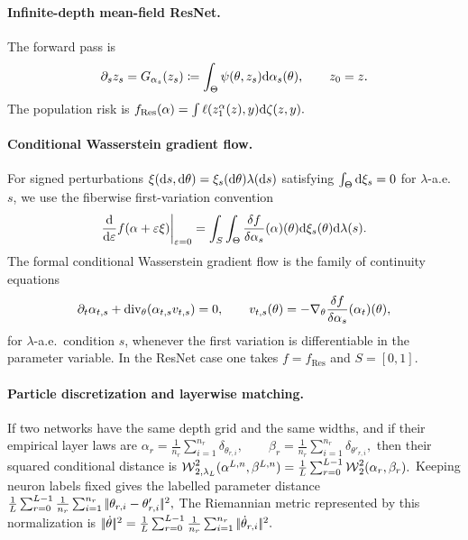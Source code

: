 \paragraph{Infinite-depth mean-field ResNet.}
The forward pass is
\begin{equation}\label{eq-mean-field-resnet-forward}
\partial_s z_s
=
G_{\alpha_s}(z_s)
\coloneqq
\int_\Theta \psi(\theta,z_s)\mathrm{d}\alpha_s(\theta),
\qquad z_0=z.
\end{equation}
The population risk is \(f_{\mathrm{Res}}(\alpha) = \int \ell(z_1^\alpha(z),y)\mathrm{d}\zeta(z,y).\)
\paragraph{Conditional Wasserstein gradient flow.}
For signed perturbations $\xi(\mathrm{d} s,\mathrm{d}\theta)=\xi_s(\mathrm{d}\theta)\lambda(\mathrm{d} s)$ satisfying $\int_\Theta\mathrm{d}\xi_s=0$ for $\lambda$-a.e.\ $s$, we use the fiberwise first-variation convention
\[
\frac{\mathrm{d}}{\mathrm{d}\varepsilon}f(\alpha+\varepsilon\xi)\bigg|_{\varepsilon=0}
=
\int_S\int_\Theta \frac{\delta f}{\delta\alpha_s}(\alpha)(\theta)\mathrm{d}\xi_s(\theta)\mathrm{d}\lambda(s).
\]
The formal conditional Wasserstein gradient flow is the family of continuity equations
\begin{equation}\label{eq-conditional-resnet-gradient-flow}
\partial_t\alpha_{t,s}
+\operatorname{div}_\theta(\alpha_{t,s}v_{t,s})=0,
\qquad
v_{t,s}(\theta)
=
-\nabla_\theta\frac{\delta f}{\delta\alpha_s}(\alpha_t)(\theta),
\end{equation}
for $\lambda$-a.e.\ condition $s$, whenever the first variation is differentiable in the parameter variable. In the ResNet case one takes $f=f_{\mathrm{Res}}$ and $S=[0,1]$.

\paragraph{Particle discretization and layerwise matching.}
If two networks have the same depth grid and the same widths, and if their empirical layer laws are \(\alpha_r=\frac1{n_r}\sum_{i=1}^{n_r}\delta_{\theta_{r,i}}, \qquad \beta_r=\frac1{n_r}\sum_{i=1}^{n_r}\delta_{\theta'_{r,i}},\)
then their squared conditional distance is \(\operatorname{\mathcal{W}}_{2,\lambda_L}^2(\alpha^{L,n},\beta^{L,n}) = \frac1L\sum_{r=0}^{L-1} \operatorname{\mathcal{W}}_2^2(\alpha_r,\beta_r).\)
Keeping neuron labels fixed gives the labelled parameter distance
\(\frac1L\sum_{r=0}^{L-1}\frac1{n_r} \sum_{i=1}^{n_r}|\!| \theta_{r,i}-\theta'_{r,i} |\!|^2,\)
The Riemannian metric represented by this normalization is \(|\!| \dot\theta |\!|^2 = \frac1L\sum_{r=0}^{L-1}\frac1{n_r} \sum_{i=1}^{n_r}|\!| \dot\theta_{r,i} |\!|^2.\)
